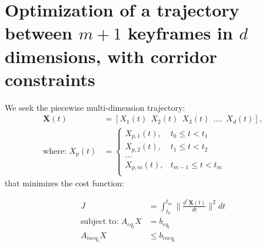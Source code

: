 \documentclass[11pt]{article}
\begin{document}
\newpage
\section{Optimization of a trajectory between $m+1$ keyframes in $d$ dimensions, with corridor constraints} 

\mbox{} \newline
We seek the piecewise multi-dimension trajectory: 
\begin{align*}
\mathbf{X} (t) &= [X_1(t) \ \ X_2(t) \ \ X_3(t) \ \ .... \ \ X_d(t) ], \\
\text{where: } X_p(t) &= 
\begin{cases}
    X_{p, 1} (t), & t_0 \le t < t_1 \\
    X_{p, 2} (t), & t_1 \le t < t_2 \\
    ... \\
    X_{p, m} (t), & t_{m-1} \le t < t_m \\
\end{cases}
\end{align*} 
that minimizes the cost function:

\begin{align*}
J &= \int_{t_0}^{t_m} \|  \frac{d^{r} \mathbf{X} (t) }{dt} \|^2 dt \\
\text{subject to: } A_{eq_t} X &= b_{eq_t} \\
A_{ineq_t} X &\le b_{ineq_t}
\end{align*}
\end{document}

